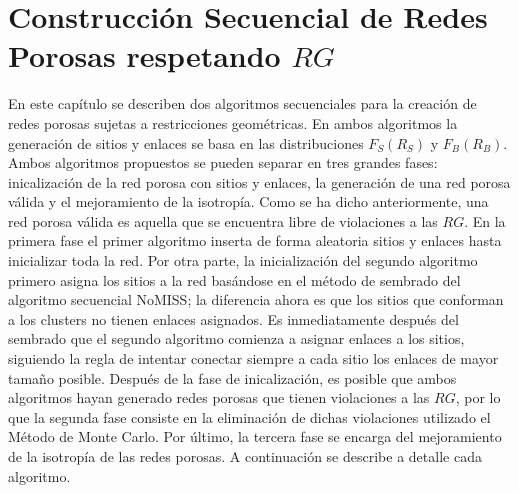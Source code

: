 \chapter[Construcción Secuencial]{Construcción Secuencial de Redes Porosas respetando $RG$}
\label{champ:BSGR}
\bigskip
\barra
\bigskip



En este capítulo se describen dos algoritmos secuenciales para la creación de redes porosas sujetas a restricciones geométricas. 
En ambos algoritmos la generación de sitios y enlaces se basa en las distribuciones $F_S(R_S)$ y $F_B(R_B)$. Ambos algoritmos propuestos 
se pueden separar en tres grandes fases: inicalizaci\'on de la red porosa con sitios y enlaces, la generación de una red porosa v\'alida y
el mejoramiento de la isotrop\'ia. 
Como se ha dicho anteriormente, una red porosa v\'alida es aquella que se encuentra libre de violaciones a las $RG$. En la primera fase 
el primer algoritmo inserta de forma aleatoria sitios y enlaces hasta inicializar toda la red. Por otra parte, la inicialización del segundo 
algoritmo primero asigna los sitios a la red basándose en el método de sembrado del algoritmo secuencial NoMISS; la diferencia ahora es que 
los sitios que conforman a los clusters no tienen enlaces asignados. Es inmediatamente después del sembrado que el segundo algoritmo comienza 
a asignar enlaces a los sitios, siguiendo la regla de intentar conectar siempre a cada sitio los enlaces de mayor tamaño posible. 
Después de la fase de inicalizaci\'on, es posible que ambos algoritmos hayan generado redes porosas que tienen violaciones a las $RG$, por lo que 
la segunda fase consiste en la eliminaci\'on de dichas violaciones utilizado el Método de Monte Carlo. Por \'ultimo, la tercera fase se 
encarga del mejoramiento de la isotrop\'ia de las redes porosas. A continuación 
se describe a detalle cada algoritmo. 


